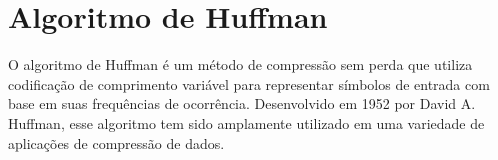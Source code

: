 \begin{figure}[H]
	\centering
\end{figure}

\section{Algoritmo de Huffman}
O algoritmo de Huffman \cite{huffmanArticle} é um método de compressão sem perda que utiliza codificação de comprimento variável para representar símbolos de entrada com base em suas frequências de ocorrência. Desenvolvido em 1952 por David A. Huffman, esse algoritmo tem sido amplamente utilizado em uma variedade de aplicações de compressão de dados.

\begin{figure}[!htbp]
    \centering
\end{figure}

